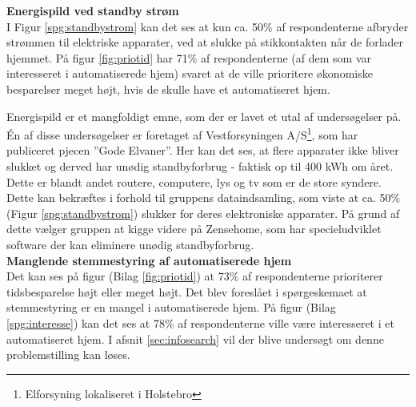 {\bf Energispild ved standby strøm} \\
I Figur \ref{spg:standbystrom} kan det ses at kun ca. 50\% af respondenterne afbryder strømmen til elektriske apparater, ved at slukke på stikkontakten når de forlader hjemmet. På figur \ref{fig:priotid} har 71\% af respondenterne (af dem som var interesseret i automatiserede hjem) svaret at de ville prioritere økonomiske besparelser meget højt, hvis de skulle have et automatiseret hjem.\\

Energispild er et mangfoldigt emne, som der er lavet et utal af undersøgelser på. Én af disse undersøgelser er foretaget af Vestforsyningen A/S\footnote{Elforsyning lokaliseret i Holstebro}, som har publiceret pjecen ”Gode Elvaner”\cite{GodeElvaner}. Her kan det ses, at flere apparater ikke bliver slukket og derved har unødig standbyforbrug - faktisk op til 400 kWh om året. Dette er blandt andet routere, computere, lys og tv som er de store syndere. Dette kan bekræftes i forhold til gruppens dataindsamling, som viste at ca. 50\% (Figur \ref{spg:standbystrom}) slukker for deres elektroniske apparater. På grund af dette vælger gruppen at kigge videre på Zensehome, som har specieludviklet software der kan eliminere unødig standbyforbrug. \\

{\bf Manglende stemmestyring af automatiserede hjem} \\
Det kan ses på figur (Bilag \ref{fig:priotid}) at 73\% af respondenterne prioriterer tidsbesparelse højt eller meget højt. Det blev foreslået i spørgeskemaet at stemmestyring er en mangel i automatiserede hjem. På figur (Bilag \ref{spg:interesse}) kan det ses at 78\% af respondenterne ville være interesseret i et automatiseret hjem. I afsnit \ref{sec:infosearch} vil der blive undersøgt om denne problemstilling kan løses. \\
